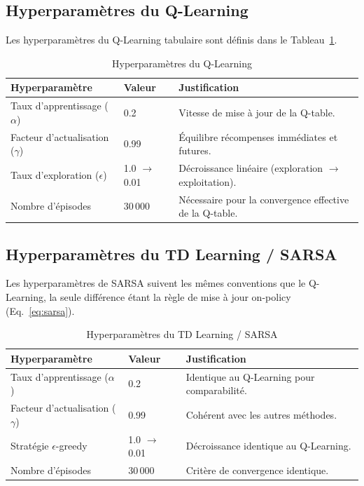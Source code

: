 \documentclass[11pt,a4paper]{report}
\begin{document}
\subsection{Hyperparamètres du Q-Learning}
\label{sec:hp-q-learning}
Les hyperparamètres du Q-Learning tabulaire sont définis dans le Tableau~\ref{tab:hp-q-learning}.

\begin{table}[H]
\centering
\caption{Hyperparamètres du Q-Learning}
\label{tab:hp-q-learning}
\begin{tabular}{llp{7cm}}
\toprule
\textbf{Hyperparamètre} & \textbf{Valeur} & \textbf{Justification} \\
\midrule
Taux d'apprentissage ($\alpha$) & 0.2 & Vitesse de mise à jour de la Q-table. \\
Facteur d'actualisation ($\gamma$) & 0.99 & Équilibre récompenses immédiates et futures. \\
Taux d'exploration ($\epsilon$) & 1.0 $\to$ 0.01 & Décroissance linéaire (exploration $\to$ exploitation). \\
Nombre d'épisodes & 30\,000 & Nécessaire pour la convergence effective de la Q-table. \\
\bottomrule
\end{tabular}
\end{table}

\subsection{Hyperparamètres du TD Learning / SARSA}
\label{sec:hp-td-sarsa}
Les hyperparamètres de SARSA suivent les mêmes conventions que le Q-Learning, la seule différence étant la règle de mise à jour on-policy (Eq.~\ref{eq:sarsa}).

\begin{table}[H]
\centering
\caption{Hyperparamètres du TD Learning / SARSA}
\label{tab:hp-sarsa}
\begin{tabular}{llp{7cm}}
\toprule
\textbf{Hyperparamètre} & \textbf{Valeur} & \textbf{Justification} \\
\midrule
Taux d'apprentissage ($\alpha$) & 0.2 & Identique au Q-Learning pour comparabilité. \\
Facteur d'actualisation ($\gamma$) & 0.99 & Cohérent avec les autres méthodes. \\
Stratégie $\epsilon$-greedy & 1.0 $\to$ 0.01 & Décroissance identique au Q-Learning. \\
Nombre d'épisodes & 30\,000 & Critère de convergence identique. \\
\bottomrule
\end{tabular}
\end{table}
\end{document}

